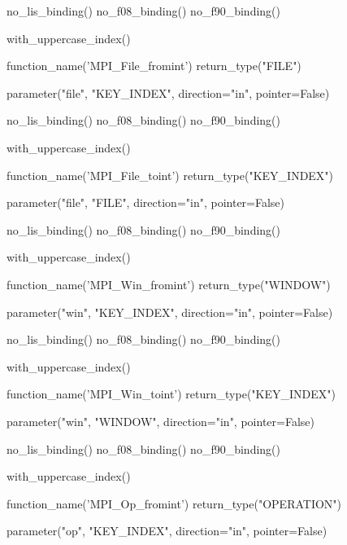 %
\begin{mpi-binding}
    no_lis_binding()
    no_f08_binding()
    no_f90_binding()

    with_uppercase_index()

    function_name('MPI_File_fromint')
    return_type("FILE")

    parameter("file", "KEY_INDEX", direction="in", pointer=False)
\end{mpi-binding}

%
\begin{mpi-binding}
    no_lis_binding()
    no_f08_binding()
    no_f90_binding()

    with_uppercase_index()

    function_name('MPI_File_toint')
    return_type("KEY_INDEX")

    parameter("file", "FILE", direction="in", pointer=False)
\end{mpi-binding}

%
\begin{mpi-binding}
    no_lis_binding()
    no_f08_binding()
    no_f90_binding()

    with_uppercase_index()

    function_name('MPI_Win_fromint')
    return_type("WINDOW")

    parameter("win", "KEY_INDEX", direction="in", pointer=False)
\end{mpi-binding}

%
\begin{mpi-binding}
    no_lis_binding()
    no_f08_binding()
    no_f90_binding()

    with_uppercase_index()

    function_name('MPI_Win_toint')
    return_type("KEY_INDEX")

    parameter("win", "WINDOW", direction="in", pointer=False)
\end{mpi-binding}

%
\begin{mpi-binding}
    no_lis_binding()
    no_f08_binding()
    no_f90_binding()

    with_uppercase_index()

    function_name('MPI_Op_fromint')
    return_type("OPERATION")

    parameter("op", "KEY_INDEX", direction="in", pointer=False)
\end{mpi-binding}

